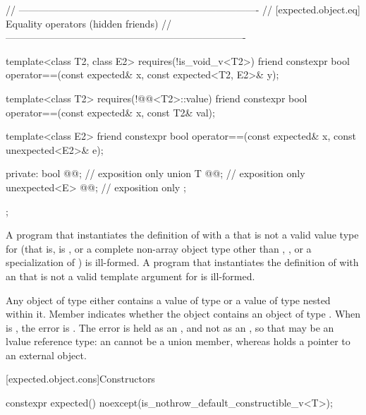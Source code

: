 \begin{codeblock}
{  // -------------------------------------------------------------------------
  // [expected.object.eq] Equality operators (hidden friends)
  // -------------------------------------------------------------------------

  template<class T2, class E2>
    requires(!is_void_v<T2>)
  friend constexpr bool operator==(const expected& x, const expected<T2, E2>& y);

  template<class T2>
    requires(!@@<T2>::value)
  friend constexpr bool operator==(const expected& x, const T2& val);

  template<class E2>
  friend constexpr bool operator==(const expected& x, const unexpected<E2>& e);

private:
  bool @@; // exposition only
  union {
    T @@;              // exposition only
    unexpected<E> @@; // exposition only
  };
};
\end{codeblock}

\begin{itemdescr}
\pnum
\mandates
A program that instantiates the definition of  with a  that is not a valid value type for  (that is,  is , or a complete non-array object type other than , , or a specialization of ) is ill-formed. A program that instantiates the definition of  with an  that is not a valid template argument for  is ill-formed.

\pnum
\remarks
Any object of type  either contains a value of type  or a value of type  nested within it. Member  indicates whether the  object contains an object of type . When  is , the error is . The error is held as an , and not as an , so that  may be an lvalue reference type: an  cannot be a union member, whereas  holds a pointer to an external object.
\end{itemdescr}

[expected.object.cons]{Constructors}

%
\begin{itemdecl}
constexpr expected() noexcept(is_nothrow_default_constructible_v<T>);
\end{itemdecl}

